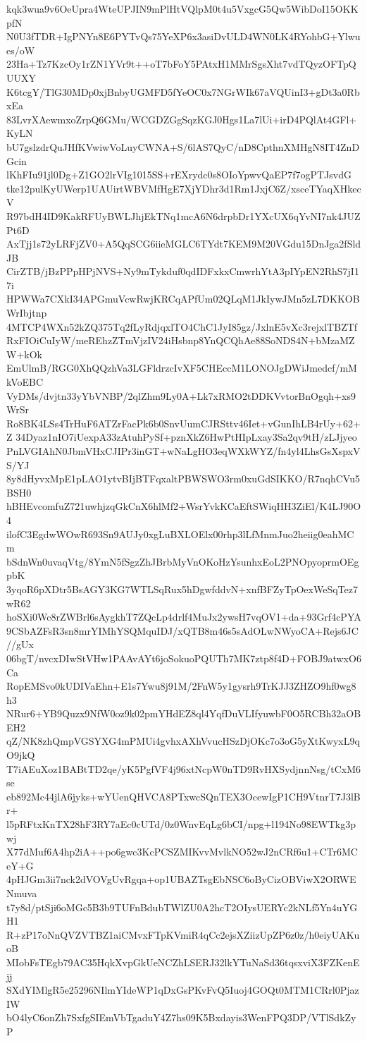 kqk3wua9v6OeUpra4WteUPJIN9mPlHtVQlpM0t4u5VxgcG5Qw5WibDoI15OKKpfN
N0U3fTDR+IgPNYn8E6PYTvQs75YeXP6x3asiDvULD4WN0LK4RYohbG+Ylwues/oW
23Ha+Tz7KzcOy1rZN1YVr9t++oT7bFoY5PAtxH1MMrSgsXht7vdTQyzOFTpQUUXY
K6tcgY/TlG30MDp0xjBnbyUGMFD5fYeOC0x7NGrWIk67aVQUinI3+gDt3a0RbxEa
83LvrXAewmxoZrpQ6GMu/WCGDZGgSqzKGJ0Hgs1La7lUi+irD4PQlAt4GFl+KyLN
bU7gslzdrQuJHfKVwiwVoLuyCWNA+S/6lAS7QyC/nD8CpthnXMHgN8IT4ZnDGcin
lKhFIu91jl0Dg+Z1GO2lrVIg1015SS+rEXrydc0s8OIoYpwvQaEP7f7ogPTJsvdG
tke12pulKyUWerp1UAUirtWBVMfHgE7XjYDhr3d1Rm1JxjC6Z/xsceTYaqXHkecV
R97bdH4ID9KakRFUyBWLJhjEkTNq1mcA6N6drpbDr1YXcUX6qYvNI7nk4JUZPt6D
AxTjj1s72yLRFjZV0+A5QqSCG6iieMGLC6TYdt7KEM9M20VGdu15DnJga2fSldJB
CirZTB/jBzPPpHPjNVS+Ny9mTykduf0qdIDFxkxCmwrhYtA3pIYpEN2RhS7jI17i
HPWWa7CXkI34APGmuVcwRwjKRCqAPfUm02QLqM1JkIywJMn5zL7DKKOBWrIbjtnp
4MTCP4WXn52kZQ375Tq2fLyRdjqxlTO4ChC1JyI85gz/JxlnE5vXc3rejxlTBZTf
RxFIOiCuIyW/meREhzZTmVjzIV24iHsbnp8YnQCQhAe88SoNDS4N+bMzaMZW+kOk
EmUlmB/RGG0XhQQzhVa3LGFldrzcIvXF5CHEccM1LONOJgDWiJmedcf/mMkVoEBC
VyDMs/dvjtn33yYbVNBP/2qlZhm9Ly0A+Lk7xRMO2tDDKVvtorBnOgqh+xs9WrSr
Ro8BK4LSs4TrHuF6ATZrFacPk6b0SnvUumCJRSttv46Iet+vGunIhLB4rUy+62+Z
34Dyaz1nIO7iUexpA33zAtuhPySf+pznXkZ6HwPtHIpLxay3Sa2qv9tH/zLJjyeo
PnLVGIAhN0JbmVHxCJIPr3inGT+wNaLgHO3eqWXkWYZ/fn4yl4LhsGsXspxVS/YJ
8y8dHyvxMpE1pLAO1ytvBIjBTFqxaltPBWSWO3rm0xuGdSIKKO/R7nqhCVu5BSH0
hBHEvcomfuZ721uwhjzqGkCnX6hlMf2+WsrYvkKCaEftSWiqHH3ZiEl/K4LJ90O4
ilofC3EgdwWOwR693Sn9AUJy0xgLuBXLOElx00rhp3lLfMnmJuo2heiig0eahMCm
bSdnWn0uvaqVtg/8YmN5fSgzZhJBrbMyVnOKoHzYsunhxEoL2PNOpyoprmOEgpbK
3yqoR6pXDtr5BsAGY3KG7WTLSqRux5hDgwfddvN+xnfBFZyTpOexWeSqTez7wR62
hoSXi0Wc8rZWBrl6sAygkhT7ZQcLp4drlf4MuJx2ywsH7vqOV1+da+93Grf4cPYA
9CSbAZFsR3sn8mrYIMhYSQMquIDJ/xQTB8m46s5sAdOLwNWyoCA+Rejs6JC//gUx
06bgT/nvcxDIwStVHw1PAAvAYt6joSokuoPQUTh7MK7ztp8f4D+FOBJ9atwxO6Ca
RopEMSvo0kUDIVaEhn+E1s7Ywu8j91M/2FnW5y1gysrh9TrKJJ3ZHZO9hf0wg8h3
NRur6+YB9Quzx9NfW0oz9k02pmYHdEZ8ql4YqfDuVLIfyuwbF0O5RCBh32aOBEH2
qZ/NK8zhQmpVGSYXG4mPMUi4gvhxAXhVvucHSzDjOKc7o3oG5yXtKwyxL9qO9jkQ
T7iAEuXoz1BABtTD2qe/yK5PgfVF4j96xtNcpW0nTD9RvHXSydjnnNsg/tCxM6se
eb892Mc44jlA6jyks+wYUenQHVCA8PTxwcSQnTEX3OcewIgP1CH9VtnrT7J3lBr+
l5pRFtxKnTX28hF3RY7aEc0cUTd/0z0WnvEqLg6bCI/npg+l194No98EWTkg3pwj
X77dMuf6A4hp2iA++po6gwc3KcPCSZMIKvvMvlkNO52wJ2nCRf6u1+CTr6MCeY+G
4pHJGm3ii7nck2dVOVgUvRgqa+op1UBAZTsgEbNSC6oByCizOBViwX2ORWENmuva
t7y8d/ptSji6oMGc5B3b9TUFnBdubTWlZU0A2hcT2OIysUERYc2kNLf5Yn4uYGH1
R+zP17oNnQVZVTBZ1aiCMvxFTpKVmiR4qCc2ejsXZiizUpZP6z0z/h0eiyUAKuoB
MIobFsTEgb79AC35HqkXvpGkUeNCZhLSERJ32lkYTuNaSd36tqsxviX3FZKenEjj
SXdYIMlgR5e25296NIlmYIdeWP1qDxGsPKvFvQ5Iuoj4GOQt0MTM1CRrl0PjazIW
bO4lyC6onZh7SxfgSIEmVbTgaduY4Z7hs09K5Bxdayis3WenFPQ3DP/VTlSdkZyP
